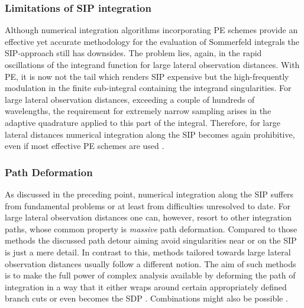 \subsubsection{Limitations of \acs{SIP} integration}

Although numerical integration algorithms incorporating \ac{PE} schemes provide
an effective yet accurate methodology for the evaluation of Sommerfeld integrals
the \ac{SIP}-approach still has downsides.
The problem lies, again, in the rapid oscillations of the integrand function
for large lateral observation distances.
With \ac{PE}, it is now not the tail which renders \ac{SIP} expensive but the
high-frequently modulation in the finite sub-integral containing
the integrand singularities.
For large lateral observation distances, exceeding a couple of hundreds of
wavelengths, the requirement for extremely narrow sampling arises in
the adaptive quadrature applied to this part of the integral.
Therefore, for large lateral distances numerical integration along the \ac{SIP} 
becomes again prohibitive, even if most effective \ac{PE} schemes are used
\cite[14]{Michalski2016b}.






\subsubsection{Path Deformation}

As discussed in the preceding point, numerical integration along the \ac{SIP}
suffers from fundamental problems or at least from difficulties unresolved to
date.
For large lateral observation distances one can, however, resort to other
integration paths, whose common property is \emph{massive} path deformation.
Compared to those methods the discussed path detour aiming avoid singularities
near or on the \ac{SIP} is just a mere detail.
In contrast to this, methods tailored towards large lateral observation
distances usually follow a different notion.
The aim of such methods is to make the full power of complex analysis available
by deforming the path of integration in a way that it either wraps around
certain appropriately defined branch cuts \cite{Michalski2016a} or even becomes
the \ac{SDP} \cite{Michalski1987,TieJunCui1999,wu2008,hochman2010}.
Combinations might also be possible \cite{Michalski1985a}.

